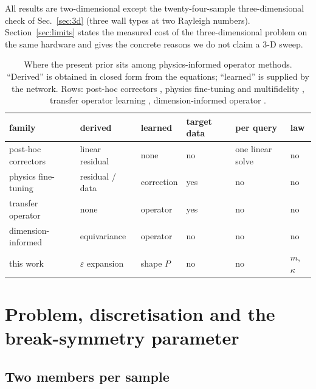 \documentclass[preprint,11pt,a4paper,times,doubleblind]{elsarticle}
\begin{document}
All results are two-dimensional except the twenty-four-sample three-dimensional check of
Sec.~\ref{sec:3d} (three wall types at two Rayleigh numbers). Section~\ref{sec:limits} states the measured cost of the
three-dimensional problem on the same hardware and gives the concrete reasons we do not claim a 3-D
sweep.
\begin{table}[htbp]
\centering
\footnotesize
\setlength{\tabcolsep}{3pt}
\caption{Where the present prior sits among physics-informed operator methods. ``Derived'' is
obtained in closed form from the equations; ``learned'' is supplied by the network. Rows:
post-hoc correctors \citep{jha2023residual,cao2023residual}, physics fine-tuning and multifidelity
\citep{zhu2023reliable}, transfer operator learning \citep{goswami2022deep}, dimension-informed
operator \citep{song2024dimino}.}
\label{tab:related}
\begin{tabular}{@{}p{2.9cm}p{2.2cm}p{1.7cm}p{1.3cm}p{2.1cm}p{1.4cm}@{}}
\toprule
family & derived & learned & target data & per query & law\\
\midrule
post-hoc correctors & linear residual & none & no & one linear solve & no\\
physics fine-tuning & residual / data & correction & yes & no & no\\
transfer operator & none & operator & yes & no & no\\
dimension-informed & equivariance & operator & no & no & no\\
this work & $\varepsilon$ expansion & shape $P$ & no & no & $m$, $\kappa$\\
\bottomrule
\end{tabular}
\end{table}

\section{Problem, discretisation and the break-symmetry parameter}
\label{sec:problem}

\subsection{Two members per sample}
\label{sec:pair}
\end{document}
